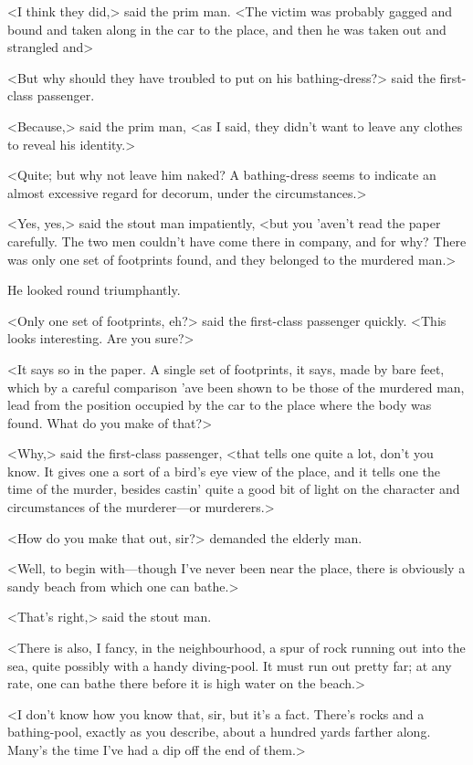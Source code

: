 <I think they did,> said the prim man. <The victim was probably gagged and bound and taken along in the car to the place, and then he was taken out and strangled and\longdash>

<But why should they have troubled to put on his bathing-dress?> said the first-class passenger.

<Because,> said the prim man, <as I said, they didn't want to leave any clothes to reveal his identity.>

<Quite; but why not leave him naked? A bathing-dress seems to indicate an almost excessive regard for decorum, under the circumstances.>

<Yes, yes,> said the stout man impatiently, <but you 'aven't read the paper carefully. The two men couldn't have come there in company, and for why? There was only one set of footprints found, and they belonged to the murdered man.>

He looked round triumphantly.

<Only one set of footprints, eh?> said the first-class passenger quickly. <This looks interesting. Are you sure?>

<It says so in the paper. A single set of footprints, it says, made by bare feet, which by a careful comparison 'ave been shown to be those of the murdered man, lead from the position occupied by the car to the place where the body was found. What do you make of that?>

<Why,> said the first-class passenger, <that tells one quite a lot, don't you know. It gives one a sort of a bird's eye view of the place, and it tells one the time of the murder, besides castin' quite a good bit of light on the character and circumstances of the murderer—or murderers.>

<How do you make that out, sir?> demanded the elderly man.

<Well, to begin with—though I've never been near the place, there is obviously a sandy beach from which one can bathe.>

<That's right,> said the stout man.

<There is also, I fancy, in the neighbourhood, a spur of rock running out into the sea, quite possibly with a handy diving-pool. It must run out pretty far; at any rate, one can bathe there before it is high water on the beach.>

<I don't know how you know that, sir, but it's a fact. There's rocks and a bathing-pool, exactly as you describe, about a hundred yards farther along. Many's the time I've had a dip off the end of them.>

